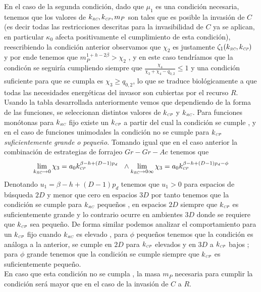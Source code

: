 En el caso de la segunda condici\'on, dado que $\mu_1$ es una condici\'on necesaria, tenemos que los valores de $k_{\textit{\tiny RC}} , k_{\textit{\tiny CP}} , m_P$ son tales que es posible la invasi\'on de $C$(es decir todas las restricciones descritas para la invasibilidad de $C$ ya se aplican, en particular $\kappa_0$ afecta positivamente el cumplimiento de esta condici\'on), reescribiendo la condici\'on anterior observamos que $\chi_2$ es justamente $\zeta_1(k_{\textit{\tiny RC}},k_{\textit{\tiny CP}})$ y por ende tenemos que $m_P^{1 + h - 2\beta} > \chi_2$ , y en este caso tendr\'iamos que la condic\'on se seguir\'ia cumpliendo siempre que $\frac{\chi_4}{\chi_3 + \chi_4 - q_{0,2}} \leq 1$ y una condici\'on suficiente para que se cumpla es $ \chi_3 \geq q_{0,2}$, lo que se traduce biol\'ogicamente a que todas las necesidades energ\'eticas del invasor son cubiertas por el recurso $R$.\\

Usando la tabla desarrollada anteriormente vemos que dependiendo de la forma de las funciones, se seleccionan distintos valores de $k_{\textit{\tiny CP}}$ y $k_{\textit{\tiny RC}}$. Para funciones mon\'otonas para $k_{\textit{\tiny RC}}$ fijo existe un $k_{\textit{\tiny CP}}$ a partir del cual la condici\'on se cumple , y en el caso de funciones unimodales la condici\'on no se cumple para $k_{\textit{\tiny CP}}$ \emph{suficientemente grande o peque\~no}. Tomando igual que en el caso anterior la combinaci\'on de estrategias de forrajeo $Gr-Gr-Ac$ tenemos que 
\begin{equation}
  \lim_{k_{\textit{\tiny RC}} \to 0} \chi_3 = a_0 k_{\textit{\tiny CP}}^{\beta - h + (D-1)p_d}  \ \ \land \lim_{k_{\textit{\tiny RC}} \to 0 \infty} \chi_3 = a_0 k_{\textit{\tiny CP}}^{\beta -h + (D-1)p_d - \phi} 
\end{equation}
Denotando $u_1 = \beta - h + (D-1)p_d$ tenemos que $ u_1 >0$ para espacios de b\'usqueda $2D$ y menor que cero en espacios $3D$ por tanto tenemos que la condici\'on se cumple para $k_{\textit{\tiny RC}}$ peque\~nos , en espacios $2D$ siempre que $k_{\textit{\tiny CP}}$ es suficientemente grande y lo contrario ocurre en ambientes $3D$ donde se requiere que $k_{\textit{\tiny CP}}$ sea peque\~no. De forma similar podemos analizar el comportamiento para un $k_{\textit{\tiny CP}}$ fijo cuando $k_{\textit{\tiny RC}}$ es elevado , para $\phi$ peque\~nos tenemos que la condici\'on es an\'aloga a la anterior, se cumple en $2D$ para $k_{\textit{\tiny CP}}$ elevados y en $3D$ a $k_{\textit{\tiny CP}}$ bajos ; para $\phi$ grande tenemos que la condici\'on se cumple siempre que $k_{\textit{\tiny CP}}$ es suficientemente peque\~no.\\
En caso que esta condici\'on no se cumpla , la masa $m_P$ necesaria para cumplir la condici\'on ser\'a mayor que en el caso de la invasi\'on de $C$ a $R$.\\

